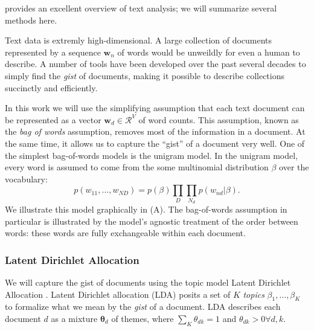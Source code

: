   \cite{grimmer:submitted} provides an excellent overview of text
  analysis; we will summarize several methods here.

  
  Text data is extremly high-dimensional.  A large collection of
  documents represented by a sequence $\bm w_n$ of words would be
  unweildly for even a human to describe.  A number of tools have been
  developed over the past several decades to simply find the
  \emph{gist} of documents, making it possible to describe collections
  succinctly and efficiently.

  In this work we will use the simplifying assumption that each text
  document can be represented as a vector $\bm w_d \in \mathcal{R}^V$
  of word counts.  This assumption, known as the \emph{bag of words}
  assumption, removes most of the information in a document.  At the
  same time, it allows us to capture the ``gist'' of a document very
  well. One of the simplest bag-of-words models is the unigram
  model. In the unigram model, every word is assumed to come from the
  some multinomial distribution $\beta$ over the vocabulary:
  \[
    p(w_{11}, \ldots, w_{ND}) = p(\beta) \prod_D \prod_{N_d} p(w_{nd} |
  \beta). \]
  We illustrate this model graphically in
   (A).  The bag-of-words assumption in
  particular is illustrated by the model's agnostic treatment of the
  order between words: these words are fully exchangeable within each
  document.

\subsubsection{Latent Dirichlet Allocation}
We will capture the gist of documents using the topic model Latent
Dirichlet Allocation \cite{blei:2003}.  Latent Dirichlet allocation
(LDA) posits a set of $K$ \emph{topics} $\beta_1, \ldots, \beta_K$ to
formalize what we mean by the \emph{gist} of a document.  LDA describes each
document $d$ as a mixture $\bm \theta_d$ of themes, where $\sum_K
\theta_{dk} = 1$ and $\theta_{dk} > 0 \forall d,k$.


